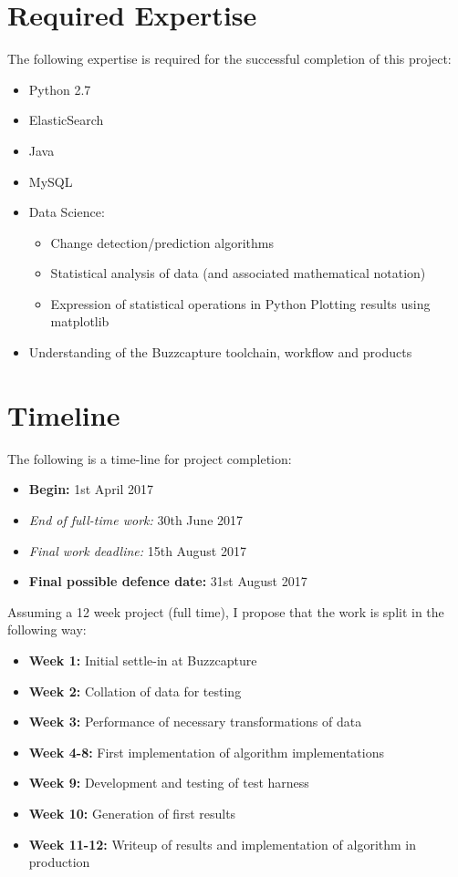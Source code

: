 \documentclass{uvamscse}
\begin{document}
\section{Required Expertise}

The following expertise is required for the successful completion of this project: 

\begin{itemize}
	\item Python 2.7
	\item ElasticSearch
	\item Java
	\item MySQL
	\item Data Science:
	\begin{itemize}
		\item Change detection/prediction algorithms
		\item Statistical analysis of data (and associated mathematical notation)
		\item Expression of statistical operations in Python
		Plotting results using matplotlib
	\end{itemize}
	\item Understanding of the Buzzcapture toolchain, workflow and products
\end{itemize}

\section{Timeline}

The following is a time-line for project completion: 

\begin{itemize}
\item \textbf{Begin:} 1st April 2017
\item \textit{End of full-time work:} 30th June 2017
\item \textit{Final work deadline:} 15th August 2017
\item \textbf{Final possible defence date:} 31st August 2017
\end{itemize}

Assuming a 12 week project (full time), I propose that the work is split in the following way: 

\begin{itemize}
\item \textbf{Week 1:} Initial settle-in at Buzzcapture
\item \textbf{Week 2:} Collation of data for testing
\item \textbf{Week 3:} Performance of necessary transformations of data
\item \textbf{Week 4-8:} First implementation of algorithm implementations
\item \textbf{Week 9:} Development and testing of test harness
\item \textbf{Week 10:} Generation of first results
\item \textbf{Week 11-12:} Writeup of results and implementation of algorithm in production
\end{itemize}
\end{document}
